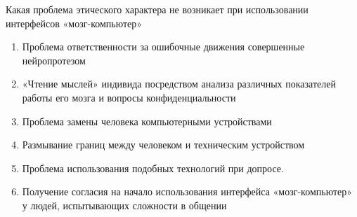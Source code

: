 
Какая проблема этического характера не возникает при использовании интерфейсов «мозг-компьютер»

\begin{enumerate}
    \item Проблема ответственности за ошибочные движения совершенные нейропротезом
    \item «Чтение мыслей» индивида посредством анализа различных показателей работы его мозга и вопросы конфиденциальности
    \item Проблема замены человека компьютерными устройствами
    \item Размывание границ между человеком и техническим устройством
    \item Проблема использования подобных технологий при допросе.
    \item Получение согласия на начало использования интерфейса «мозг-компьютер» у людей, испытывающих сложности в общении
\end{enumerate}